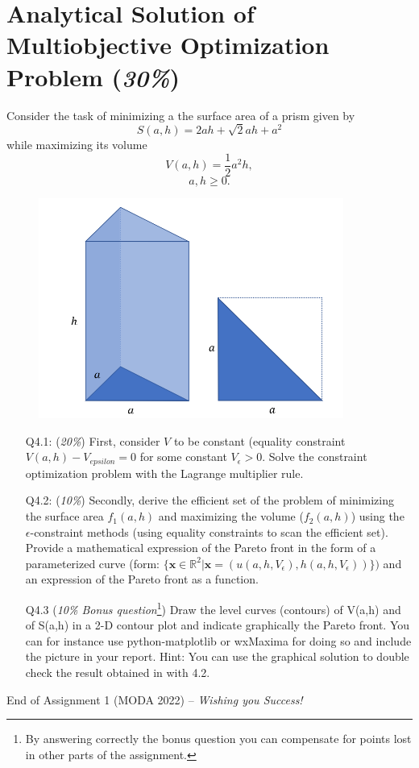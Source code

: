 \documentclass{article}
\begin{document}
\newpage
\section{Analytical Solution of Multiobjective Optimization Problem (\textit{30\%})}
Consider the task of minimizing a the surface area of a prism given 
by 
$$S(a,h)= 2 ah + \sqrt{2} ah + a^2 $$
while maximizing its volume
$$V(a,h)= \frac{1}{2} a^2 h, $$
$$a,h \geq 0.$$
\begin{figure}[t]
	\begin{center}
\includegraphics[width=10cm]{prism2022}
	\end{center}
\end{figure}
\begin{itemize}
	\item[Q4.1:] (\textit{20\%}) First, consider $V$ to be constant (equality constraint $V(a,h) - V_{epsilon} = 0$ for some constant $V_{\epsilon} > 0$. Solve the constraint optimization problem with the Lagrange multiplier rule.
	\item[Q4.2:] (\textit{10\%}) Secondly, derive the efficient set of the problem of minimizing the surface area $f_1(a,h)$ and maximizing the volume ($f_2(a,h)$) using the $\epsilon$-constraint methods (using equality constraints to scan the efficient set). Provide a mathematical expression of the Pareto front in the form of a parameterized curve (form: $\{ \mathbf{x} \in \mathbb{R}^2 | \mathbf{x}=(u(a,h,V_{\epsilon}), h(a,h, V_{\epsilon}))  \})$ and an expression of the Pareto front as a function.
	\item[Q4.3 ] (\textit{10\% Bonus question}\footnote{By answering correctly the bonus question you can compensate for points lost in other parts of the assignment.}) Draw the level curves (contours) of V(a,h) and of S(a,h) in a 2-D contour plot and indicate graphically the Pareto front. You can for instance use python-matplotlib or wxMaxima for doing so and include the picture in your report. Hint: You can use the graphical solution to double check the result obtained in with 4.2. 
\end{itemize}

End of Assignment 1 (MODA 2022) -- \textit{Wishing you Success!}
\end{document}
